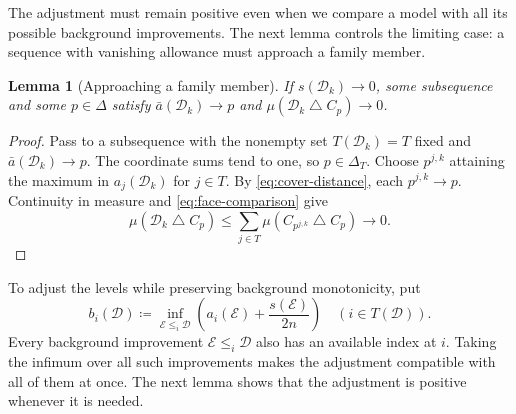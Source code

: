 \documentclass[11pt]{article}
\newtheorem{lemma}[theorem]{Lemma}
\theoremstyle{remark}
\newcommand{\sd}{\mathbin{\triangle}}
\newcommand{\Dscr}{\mathcal D}
\newcommand{\Escr}{\mathcal E}
\begin{document}
The adjustment must remain positive even when we compare a model with all
its possible background improvements. The next lemma controls the limiting
case: a sequence with vanishing allowance must approach a family member.

\begin{lemma}[Approaching a family member]\label{lem:stability}
If $s(\Dscr_k)\to0$, some subsequence and some $p\in\Delta$ satisfy
$\bar a(\Dscr_k)\to p$ and $\mu(\Dscr_k\sd C_{p})\to0$.
\end{lemma}
\begin{proof}
Pass to a subsequence with the nonempty set $T(\Dscr_k)=T$ fixed and
$\bar a(\Dscr_k)\to p$. The coordinate sums tend to one, so $p\in\Delta_T$.
Choose $p^{j,k}$ attaining the maximum in $a_j(\Dscr_k)$ for $j\in T$. By
\eqref{eq:cover-distance}, each $p^{j,k}\to p$.
Continuity in measure and \eqref{eq:face-comparison} give
\[
 \mu(\Dscr_k\sd C_{p})\le\sum_{j\in T}\mu(C_{p^{j,k}}\sd C_{p})\longrightarrow0.
\]
\end{proof}

To adjust the levels while preserving background monotonicity, put
\begin{equation}
 b_i(\Dscr)\coloneqq\inf_{\Escr\le_i\Dscr}\left(a_i(\Escr)+\frac{s(\Escr)}{2n}\right)
 \quad(i\in T(\Dscr)).
 \label{eq:envelope}
\end{equation}
Every background improvement $\Escr\le_i\Dscr$ also has an available index at $i$. Taking the
infimum over all such improvements makes the adjustment compatible with all
of them at once. The next lemma shows that the adjustment is positive
whenever it is needed.
\end{document}
